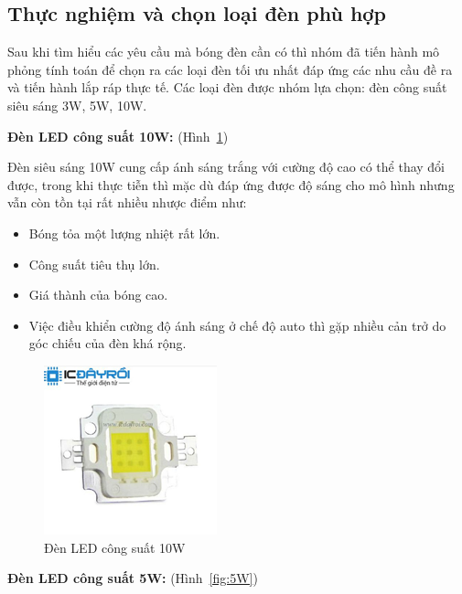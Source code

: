 \subsection{Thực nghiệm và chọn loại đèn phù hợp}
Sau khi tìm hiểu các yêu cầu mà bóng đèn cần có thì nhóm đã tiến hành mô phỏng tính toán để chọn ra các loại đèn tối ưu nhất đáp ứng các nhu cầu đề ra và tiến hành lắp ráp thực tế. Các loại đèn được nhóm lựa chọn: đèn công suất siêu sáng 3W, 5W, 10W.


\textbf{Đèn LED công suất 10W:} (Hình~\ref{fig:10W})

Đèn siêu sáng 10W cung cấp ánh sáng trắng với cường độ cao có thể thay đổi được, trong khi thực tiễn thì mặc dù đáp ứng được độ sáng cho mô hình nhưng vẫn còn tồn tại rất nhiều nhược điểm như:

\begin{itemize}
\item Bóng tỏa một lượng nhiệt rất lớn.
\item Công suất tiêu thụ lớn.
\item Giá thành của bóng cao.
\item Việc điều khiển cường độ ánh sáng ở chế độ auto thì gặp nhiều cản trở do góc chiếu của đèn khá rộng.
\end{itemize}
\begin{center}
    \begin{figure}[ht]
    \begin{center}
     \includegraphics[scale=1]{Chapters/Chapter3/Images/Led10W}
    \end{center}
    \caption{Đèn LED công suất 10W}
    \label{fig:10W}
    \end{figure}
\end{center}

\textbf{Đèn LED công suất 5W:} (Hình~\ref{fig:5W})

